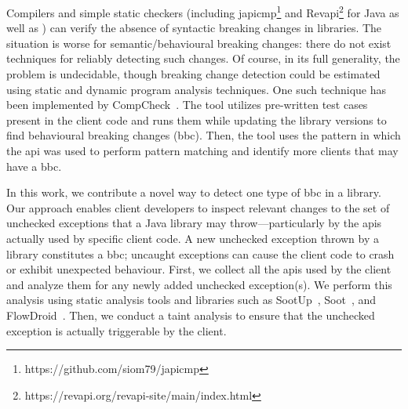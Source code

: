 Compilers and simple static
checkers (including japicmp\footnote{https://github.com/siom79/japicmp} and
Revapi\footnote{https://revapi.org/revapi-site/main/index.html} for Java as well
as \cite{brito18:_apidif,foo18:_effic_static_check_librar_updat})
can verify the absence of syntactic breaking changes in libraries. The situation
is worse for semantic/behavioural breaking changes:
there do not exist techniques for reliably detecting such changes. Of
course, in its full generality, the problem is undecidable, though
breaking change detection could be estimated using static and dynamic program analysis
techniques. One such technique has been implemented by CompCheck~\cite{CompCheck}.
The tool utilizes pre-written test cases present in the client code and runs them
while updating the library versions to find behavioural breaking changes (\gls{bbc}). Then,
the tool uses the pattern in which the \gls{api} was used to perform pattern matching
and identify more clients that may have a \gls{bbc}.

In this work, we contribute a novel way to detect one type of \gls{bbc} in a library.
Our approach enables client developers to inspect relevant changes to the set of
unchecked exceptions that a Java library may throw—particularly by the \gls{api}s
actually used by specific client code. A new unchecked exception thrown by a library
constitutes a \gls{bbc}; uncaught exceptions can cause the client code to crash or
exhibit unexpected behaviour. First, we collect all the \gls{api}s used by the client
and analyze them for any newly added unchecked exception(s). We perform this analysis
using static analysis tools and libraries such as SootUp~\cite{Karakaya24:_SootUp},
Soot~\cite{vallee2010soot}, and FlowDroid~\cite{Arzt14:_flowdroid}. Then, we conduct
a taint analysis to ensure that the unchecked exception is actually triggerable by
the client.


